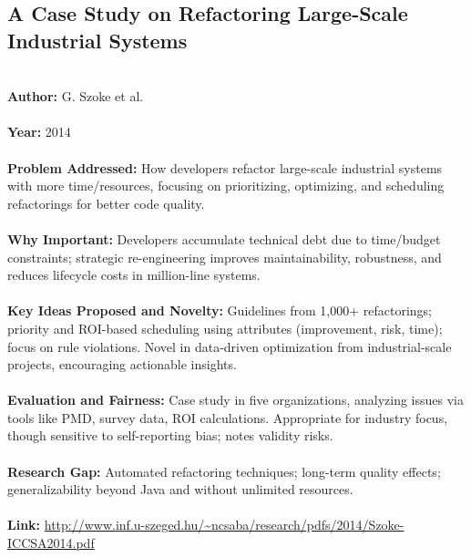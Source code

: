 \documentclass[12pt]{article}
\begin{document}
\subsection*{A Case Study on Refactoring Large-Scale Industrial Systems}
\\
\textbf{Author:} G. Szoke et al. \\
\\
\textbf{Year:} 2014 \\
\\
\textbf{Problem Addressed:} How developers refactor large-scale industrial systems with more time/resources, focusing on prioritizing, optimizing, and scheduling refactorings for better code quality. \\
\\
\textbf{Why Important:} Developers accumulate technical debt due to time/budget constraints; strategic re-engineering improves maintainability, robustness, and reduces lifecycle costs in million-line systems. \\
\\
\textbf{Key Ideas Proposed and Novelty:} Guidelines from 1,000+ refactorings; priority and ROI-based scheduling using attributes (improvement, risk, time); focus on rule violations. Novel in data-driven optimization from industrial-scale projects, encouraging actionable insights. \\
\\
\textbf{Evaluation and Fairness:} Case study in five organizations, analyzing issues via tools like PMD, survey data, ROI calculations. Appropriate for industry focus, though sensitive to self-reporting bias; notes validity risks. \\
\\
\textbf{Research Gap:} Automated refactoring techniques; long-term quality effects; generalizability beyond Java and without unlimited resources. \\
\\
\textbf{Link:} \url{http://www.inf.u-szeged.hu/~ncsaba/research/pdfs/2014/Szoke-ICCSA2014.pdf}
\pagebreak

\end{document}
